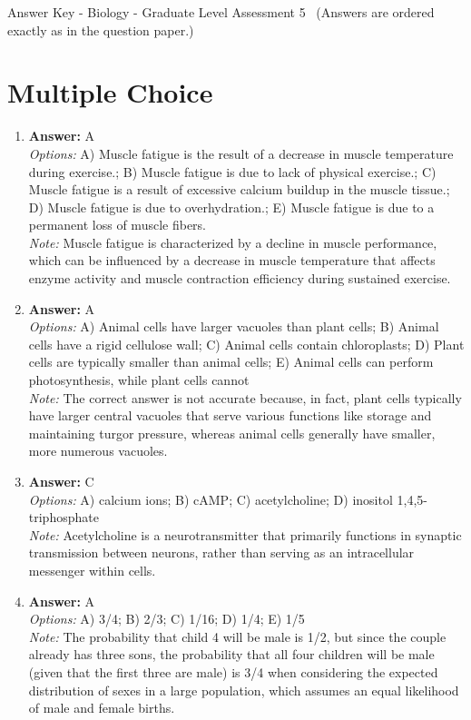 \documentclass[12pt]{article}
\begin{document}
\begin{center}
Answer Key - Biology - Graduate Level Assessment 5 \
\small (Answers are ordered exactly as in the question paper.)
\end{center}

\section*{Multiple Choice}
\begin{enumerate}[label=\arabic*.]
\item \textbf{Answer:} A
\\ \textit{Options:} A) Muscle fatigue is the result of a decrease in muscle temperature during exercise.; B) Muscle fatigue is due to lack of physical exercise.; C) Muscle fatigue is a result of excessive calcium buildup in the muscle tissue.; D) Muscle fatigue is due to overhydration.; E) Muscle fatigue is due to a permanent loss of muscle fibers.
\\ \textit{Note:} Muscle fatigue is characterized by a decline in muscle performance, which can be influenced by a decrease in muscle temperature that affects enzyme activity and muscle contraction efficiency during sustained exercise.
\item \textbf{Answer:} A
\\ \textit{Options:} A) Animal cells have larger vacuoles than plant cells; B) Animal cells have a rigid cellulose wall; C) Animal cells contain chloroplasts; D) Plant cells are typically smaller than animal cells; E) Animal cells can perform photosynthesis, while plant cells cannot
\\ \textit{Note:} The correct answer is not accurate because, in fact, plant cells typically have larger central vacuoles that serve various functions like storage and maintaining turgor pressure, whereas animal cells generally have smaller, more numerous vacuoles.
\item \textbf{Answer:} C
\\ \textit{Options:} A) calcium ions; B) cAMP; C) acetylcholine; D) inositol 1,4,5-triphosphate
\\ \textit{Note:} Acetylcholine is a neurotransmitter that primarily functions in synaptic transmission between neurons, rather than serving as an intracellular messenger within cells.
\item \textbf{Answer:} A
\\ \textit{Options:} A) 3/4; B) 2/3; C) 1/16; D) 1/4; E) 1/5
\\ \textit{Note:} The probability that child 4 will be male is 1/2, but since the couple already has three sons, the probability that all four children will be male (given that the first three are male) is 3/4 when considering the expected distribution of sexes in a large population, which assumes an equal likelihood of male and female births.

\end{enumerate}
\end{document}
